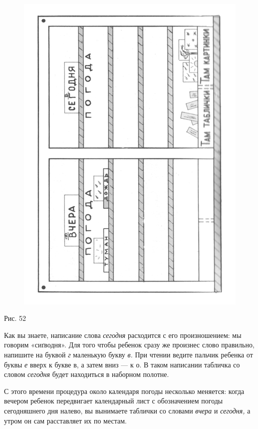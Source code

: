 \documentclass[a5paper]{book}
\renewcommand{\emph}[1]{\textit{#1}}
\begin{document}
\begin{figure}
\centering
\includegraphics[width=\linewidth]{media/media/image48.png}
\end{figure}

Рис. 52

Как вы знаете, написание слова \emph{сегодня} расходится с его
произношением: мы говорим «сиґводня». Для того чтобы ребенок сразу же
произнес слово правильно, напишите на буквой \emph{г} маленькую букву
\emph{в.} При чтении ведите пальчик ребенка от буквы \emph{е} вверх к
букве в, а затем вниз --- к о. В таком написании табличка со словом
\emph{сегодня} будет находиться в наборном полотне.

С этого времени процедура около календаря погоды несколько меняется:
когда вечером ребенок передвигает календарный лист с обозначением погоды
сегодняшнего дня налево, вы вынимаете таблички со словами \emph{вчера} и
\emph{сегодня,} а утром он сам расставляет их по местам.
\end{document}
